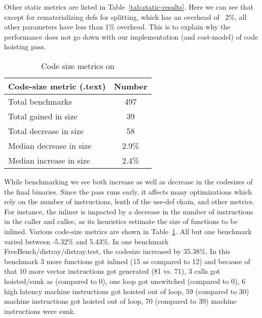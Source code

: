 \documentclass{sig-alternate}
\begin{document}
Other static metrics are listed in Table~\ref{tab:static-results}. Here we can
see that except for rematerializing defs for splitting, which has an overhead of ~2\%, all
other parameters have less than 1\% overhead. This is to explain why the performance does not
go down with our implementation (and cost-model) of code hoisting pass.

\begin{table}[h!]
  \begin{center}
    \begin{tabular}{|l|c|}
      \hline
      Code-size metric  (.text)                   & Number   \\\hline
      Total  benchmarks                           & 497      \\\hline
      Total  gained in size                       & 39       \\\hline
      Total  decrease in size                     & 58       \\\hline
      Median decrease in size                     & 2.9\%    \\\hline
      Median increase in size                     & 2.4\%    \\\hline
    \end{tabular}
  \end{center}
  \caption{Code size metrics on \LLVMTestSuite{}}
  \label{tab:code-size}
\end{table}

While benchmarking \LLVMTestSuite{} we see both increase as well as decrease in
the codesizes of the final binaries. Since the pass runs early, it affects many
optimizations which rely on the number of instructions, lenth of the use-def
chain, and other metrics. For instance, the inliner is impacted by a decrease in
the number of instructions in the caller and callee, as its heuristics estimate
the size of functions to be inlined. Various code-size metrics are shown in
Table~\ref{tab:code-size}. All but one benchmark varied between -5.32\% and
5.43\%.  In one benchmark FreeBench/distray/distray.test, the codesize increased
by 35.38\%. In this benchmark 3 more functions got inlined (15 as compared to
12) and because of that 10 more vector instructions got generated (81 vs. 71), 3
calls got hoisted/sunk as (compared to 0), one loop got unswitched (compared to
0), 6 high latency machine instructions got hoisted out of loop, 59 (compared to
30) machine instructions got hoisted out of loop, 70 (compared to 39) machine
instructions were sunk.
\end{document}
